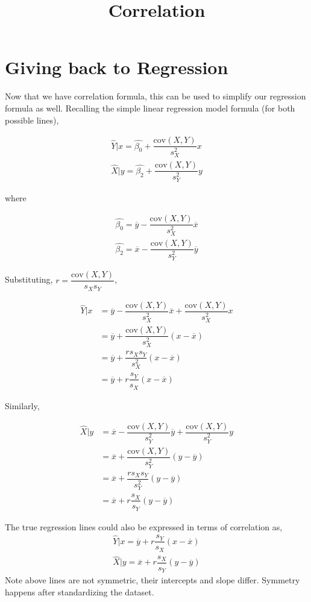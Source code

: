 \documentclass[tikz = true, float=false, crop=false, 11pt]{standalone}
\title{Correlation}
\begin{document}
 
	
	\section{Giving back to Regression}
	
	Now that we have correlation formula, this can be used to simplify our regression formula as well. Recalling the simple linear regression model formula (for both possible lines), 
	
	$$\begin{aligned}
	\hat{Y}|x = \hat{\beta_0} + \dfrac{\mathrm{cov}(X,Y)}{s_X^2}x \\
	\hat{X}|y = \hat{\beta_2} + \dfrac{\mathrm{cov}(X,Y)}{s_Y^2}y 
	\end{aligned}$$
	
	where
	
	$$\begin{aligned}
	\hat{\beta_0} = \overline{y} - \dfrac{\mathrm{cov}(X,Y)}{s_X^2}\overline{x} \\
	\hat{\beta_2} = \overline{x} - \dfrac{\mathrm{cov}(X,Y)}{s_Y^2}\overline{y}
	\end{aligned}$$
	
	Substituting, $r = \dfrac{\mathrm{cov}(X,Y)}{s_X s_Y}$, 
	
	$$\begin{aligned}
	\hat{Y}|x &= \overline{y} - \dfrac{\mathrm{cov}(X,Y)}{s_X^2}\overline{x} + \dfrac{\mathrm{cov}(X,Y)}{s_X^2}x \\
	&= \overline{y} + \dfrac{\mathrm{cov}(X,Y)}{s_X^2}(x - \overline{x}) \\
	&= \overline{y} + \dfrac{rs_X s_Y}{s_X^2}(x - \overline{x}) \\
	&= \overline{y} + r\dfrac{s_Y}{s_X}(x - \overline{x}) 
	\end{aligned}$$
	
	Similarly, 
	
	$$\begin{aligned}
	\hat{X}|y &= \overline{x} - \dfrac{\mathrm{cov}(X,Y)}{s_Y^2}\overline{y} + \dfrac{\mathrm{cov}(X,Y)}{s_Y^2}y \\
	&= \overline{x} + \dfrac{\mathrm{cov}(X,Y)}{s_Y^2}(y - \overline{y}) \\
	&= \overline{x} + \dfrac{rs_X s_Y}{s_Y^2}(y - \overline{y}) \\
	&= \overline{x} + r\dfrac{s_X}{s_Y}(y - \overline{y})
	\end{aligned}$$
	
	\begin{tcolorbox}[colback=green!5,colframe=green!40!black,title=Regression Alternate Form Via Correlation]
		The true regression lines could also be expressed in terms of correlation as, 
		\begin{align}
		\hat{Y}|x = \overline{y} + r\dfrac{s_Y}{s_X}(x - \overline{x}) \nonumber \\
		\hat{X}|y = \overline{x} + r\dfrac{s_X}{s_Y}(y - \overline{y}) 
		\end{align}
		Note above lines are not symmetric, their intercepts and slope differ. Symmetry happens after standardizing the dataset.
	\end{tcolorbox}	
	
\end{document}
